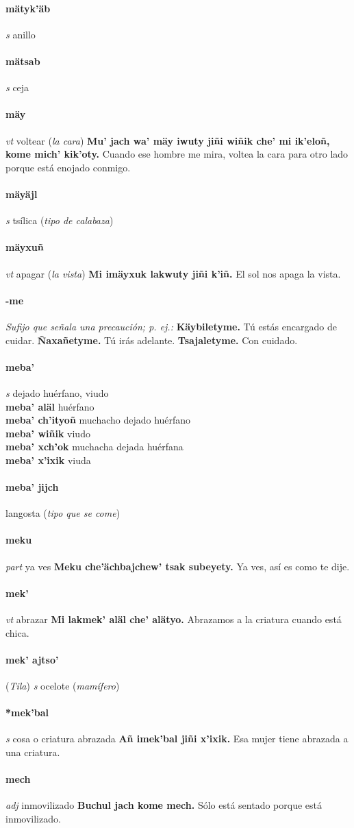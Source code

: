 \documentclass{scrbook}
\newcommand{\entry}[1]{\paragraph{#1}}
\newcommand{\nontranslationdef}[1]{\textit{#1}}
\newcommand{\partofspeech}[1]{\textit{#1}}
\newcommand{\spanishtranslation}[1]{#1}
\newcommand{\clarification}[1]{(\textit{#1})}
\newcommand{\cholexample}[1]{\textbf{#1}}
\newcommand{\exampletranslation}[1]{#1}
\newcommand{\relevantdialect}[1]{(\textit{#1})}
\newcommand{\secondaryentry}[1]{\\\textbf{#1}}
\newcommand{\secondtranslation}[1]{#1}
\begin{document}
\begin{multicols}{2}
\entry{mätyk'äb}
\partofspeech{s}
\spanishtranslation{anillo}

\entry{mätsab}
\partofspeech{s}
\spanishtranslation{ceja}

\entry{mäy}
\partofspeech{vt}
\spanishtranslation{voltear}
\clarification{la cara}
\cholexample{Mu' jach wa' mäy iwuty jiñi wiñik che' mi ik'eloñ, kome mich' kik'oty.}
\exampletranslation{Cuando ese hombre me mira, voltea la cara para otro lado porque está enojado conmigo.}

\entry{mäyäjl}
\partofspeech{s}
\spanishtranslation{tsílica}
\clarification{tipo de calabaza}

\entry{mäyxuñ}
\partofspeech{vt}
\spanishtranslation{apagar}
\clarification{la vista}
\cholexample{Mi imäyxuk lakwuty jiñi k'iñ.}
\exampletranslation{El sol nos apaga la vista.}

\entry{-me}
\nontranslationdef{Sufijo que señala una precaución; p. ej.:}
\cholexample{Käybiletyme.}
\exampletranslation{Tú estás encargado de cuidar.}
\cholexample{Ñaxañetyme.}
\exampletranslation{Tú irás adelante.}
\cholexample{Tsajaletyme.}
\exampletranslation{Con cuidado.}

\entry{meba'}
\partofspeech{s}
\spanishtranslation{dejado huérfano, viudo}
\secondaryentry{meba' aläl}
\secondtranslation{huérfano}
\secondaryentry{meba' ch'ityoñ}
\secondtranslation{muchacho dejado huérfano}
\secondaryentry{meba' wiñik}
\secondtranslation{viudo}
\secondaryentry{meba' xch'ok}
\secondtranslation{muchacha dejada huérfana}
\secondaryentry{meba' x'ixik}
\secondtranslation{viuda}

\entry{meba' jijch}
\spanishtranslation{langosta}
\clarification{tipo que se come}

\entry{meku}
\partofspeech{part}
\spanishtranslation{ya ves}
\cholexample{Meku che'ächbajchew' tsak subeyety.}
\exampletranslation{Ya ves, así es como te dije.}

\entry{mek'}
\partofspeech{vt}
\spanishtranslation{abrazar}
\cholexample{Mi lakmek' aläl che' alätyo.}
\exampletranslation{Abrazamos a la criatura cuando está chica.}

\entry{mek' ajtso'}
\relevantdialect{Tila}
\partofspeech{s}
\spanishtranslation{ocelote}
\clarification{mamífero}

\entry{*mek'bal}
\partofspeech{s}
\spanishtranslation{cosa o criatura abrazada}
\cholexample{Añ imek'bal jiñi x'ixik.}
\exampletranslation{Esa mujer tiene abrazada a una criatura.}

\entry{mech}
\partofspeech{adj}
\spanishtranslation{inmovilizado}
\cholexample{Buchul jach kome mech.}
\exampletranslation{Sólo está sentado porque está inmovilizado.}


\end{multicols}
\end{document}

